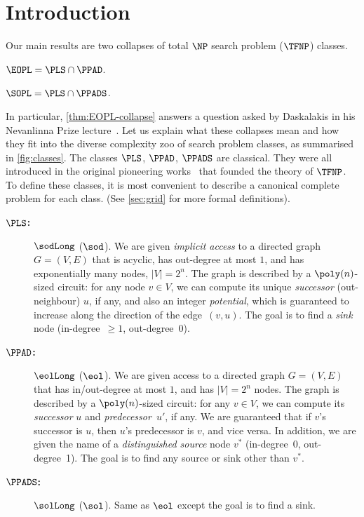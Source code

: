 \section{Introduction}

Our main results are two collapses of total $\NP$ search problem ($\TFNP$) classes.
\begin{theorem}\label{thm:EOPL-collapse}
$\EOPL = \PLS\cap\PPAD$.
\end{theorem}
\begin{theorem}\label{thm:SOPL-collapse}
$\SOPL = \PLS\cap\PPADS$.
\end{theorem}

In particular, \cref{thm:EOPL-collapse} answers a question asked by Daskalakis in his Nevanlinna Prize lecture~\cite[Open Question 10]{Daskalakis2019}. Let us explain what these collapses mean and how they fit into the diverse complexity zoo of search problem classes, as summarised in \cref{fig:classes}. The classes $\PLS$, $\PPAD$, $\PPADS$ are classical. They were all introduced in the original pioneering works~\cite{Megiddo1991, Johnson1988,Papadimitriou1994} that founded the theory of $\TFNP$. To define these classes, it is most convenient to describe a canonical complete problem for each class. (See \cref{sec:grid} for more formal definitions).
\begin{description}
\item[\bf $\PLS$:] $\sodLong$ ($\sod$). We are given \emph{implicit access} to a directed graph $G=(V,E)$ that is acyclic, has out-degree at most $1$, and has exponentially many nodes, $|V|=2^n$. The graph is described by a $\poly(n)$-sized circuit: for any node $v\in V$, we can compute its unique \emph{successor} (out-neighbour) $u$, if any, and also an integer \emph{potential}, which is guaranteed to increase along the direction of the edge~$(v,u)$. The goal is to find a \emph{sink} node (in-degree~$\geq 1$, out-degree~0).

\item[\bf $\PPAD$:] $\eolLong$ ($\eol$). We are given access to a directed graph $G=(V,E)$ that has in/out-degree at most $1$, and has $|V|=2^n$ nodes. The graph is described by a $\poly(n)$-sized circuit: for any $v\in V$, we can compute its \emph{successor} $u$ and \emph{predecessor}~$u'$, if any. We are guaranteed that if $v$'s successor is $u$, then $u$'s predecessor is $v$, and vice versa. In addition, we are given the name of a \emph{distinguished source} node $v^*$ (in-degree~0, out-degree~1). The goal is to find any source or sink other than $v^*$.

\item[\bf $\PPADS$:] $\solLong$ ($\sol$). Same as $\eol$ except the goal is to find a sink.
\end{description}

